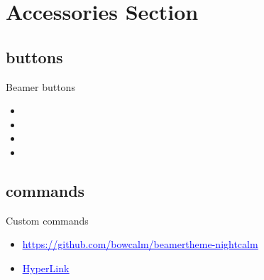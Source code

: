 \documentclass[12pt,unicode]{beamer}
\newcommand{\link}[1]{\href{#1}{\textcolor{blue}{\underline{#1}}}}
\newcommand{\Link}[2]{\href{#2}{\textcolor{blue}{\underline{#1}}}}
\begin{document}
  \section{Accessories Section}
  \subsection{buttons}
  \begin{frame}{Beamer buttons}
    \begin{itemize}
        \item {}
        \item {}
        \item {}
        \item {}
    \end{itemize}
  \end{frame}

  \subsection{commands}
  \begin{frame}{Custom commands}
    \begin{itemize}
        \item \link{https://github.com/bowcalm/beamertheme-nightcalm}
        \item \Link{HyperLink}{https://github.com/bowcalm/beamertheme-nightcalm}
    \end{itemize}
  \end{frame}
\end{document}
